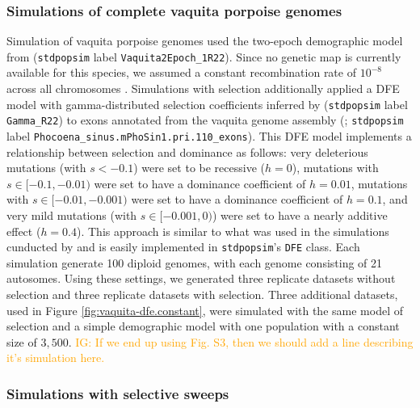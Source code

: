 \documentclass[hidelinks]{article}
\newcommand{\stdpopsim}{\texttt{stdpopsim}\xspace}
\newcommand{\igcomment}[1]{\textcolor{orange}{IG: #1}}
\begin{document}
    \subsubsection*{Simulations of complete vaquita porpoise genomes}
    Simulation of vaquita porpoise genomes used 
    the two-epoch demographic model from \cite{robinson2022critically} (\stdpopsim label \texttt{Vaquita2Epoch\_1R22}).
    Since no genetic map is currently available for this species, we assumed a constant recombination rate of  $10^{-8}$
    across all chromosomes \citep{morin2021}.
    Simulations with selection additionally applied a DFE model with gamma-distributed selection coefficients inferred by
    \cite{robinson2022critically} (\stdpopsim label \texttt{Gamma\_R22}) to exons annotated from the vaquita genome assembly
    (\cite{morin2021}; \stdpopsim label \texttt{Phocoena\_sinus.mPhoSin1.pri.110\_exons}).
    This DFE model implements a relationship between selection and dominance as follows:
    very deleterious mutations (with $s<-0.1$) were set to be recessive ($h=0$),
    mutations with $s\in [-0.1,-0.01)$ were set to have a dominance coefficient of $h=0.01$,
    mutations with $s\in [-0.01,-0.001)$ were set to have a dominance coefficient of $h=0.1$,
    and very mild mutations (with $s\in [-0.001,0)$) were set to have a nearly additive effect ($h=0.4$).
    This approach is similar to what was used in the simulations cunducted by \textcite{robinson2022critically}
    and is easily implemented in \stdpopsim's \texttt{DFE} class.
    Each simulation generate 100 diploid genomes,
    with each genome consisting of 21 autosomes.
    Using these settings, we generated three replicate datasets without selection
    and three replicate datasets with selection.
    Three additional datasets, used in Figure \ref{fig:vaquita-dfe.constant},
    were simulated with the same model of selection and a simple demographic model with one population with a constant size of $3,500$.
    \igcomment{If we end up using Fig. S3, then we should add a line describing it's simulation here.}


    \subsubsection*{Simulations with selective sweeps}
\end{document}
